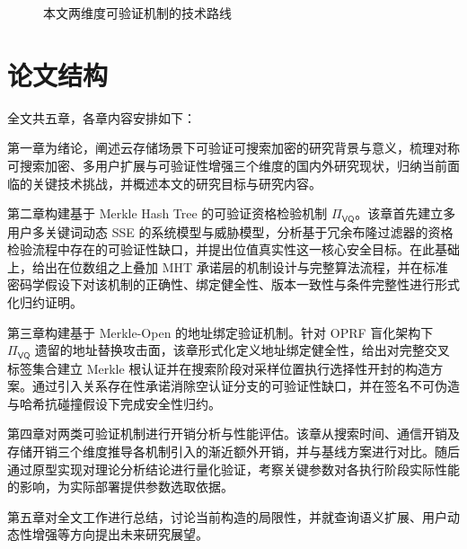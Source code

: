 \begin{figure}[htbp]
\caption{本文两维度可验证机制的技术路线}
\label{fig:intro-tech-roadmap}
\end{figure}

\section{论文结构}
全文共五章，各章内容安排如下：

第一章为绪论，阐述云存储场景下可验证可搜索加密的研究背景与意义，梳理对称可搜索加密、多用户扩展与可验证性增强三个维度的国内外研究现状，归纳当前面临的关键技术挑战，并概述本文的研究目标与研究内容。

第二章构建基于 Merkle Hash Tree 的可验证资格检验机制 $\Pi_{\mathsf{VQ}}$。该章首先建立多用户多关键词动态 SSE 的系统模型与威胁模型，分析基于冗余布隆过滤器的资格检验流程中存在的可验证性缺口，并提出位值真实性这一核心安全目标。在此基础上，给出在位数组之上叠加 MHT 承诺层的机制设计与完整算法流程，并在标准密码学假设下对该机制的正确性、绑定健全性、版本一致性与条件完整性进行形式化归约证明。

第三章构建基于 Merkle-Open 的地址绑定验证机制。针对 OPRF 盲化架构下 $\Pi_{\mathsf{VQ}}$ 遗留的地址替换攻击面，该章形式化定义地址绑定健全性，给出对完整交叉标签集合建立 Merkle 根认证并在搜索阶段对采样位置执行选择性开封的构造方案。通过引入关系存在性承诺消除空认证分支的可验证性缺口，并在签名不可伪造与哈希抗碰撞假设下完成安全性归约。

第四章对两类可验证机制进行开销分析与性能评估。该章从搜索时间、通信开销及存储开销三个维度推导各机制引入的渐近额外开销，并与基线方案进行对比。随后通过原型实现对理论分析结论进行量化验证，考察关键参数对各执行阶段实际性能的影响，为实际部署提供参数选取依据。

第五章对全文工作进行总结，讨论当前构造的局限性，并就查询语义扩展、用户动态性增强等方向提出未来研究展望。
